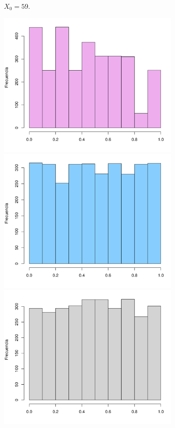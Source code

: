 \documentclass[12pt]{article}
\begin{document}
\begin{figure}
\begin{subfigure}{\textwidth}
			\caption{$X_0 = 59$.}
			\label{semilla59}
		\end{subfigure}
		\begin{subfigure}{\textwidth}
			\centering
			\includegraphics[scale=0.34]{hist_103-11-43-97.png}
			\includegraphics[scale=0.34]{hist_103-59-43-97.png}
			\includegraphics[scale=0.34]{hist_103-613-919-857.png}

\end{subfigure}
\end{figure}
\end{document}
